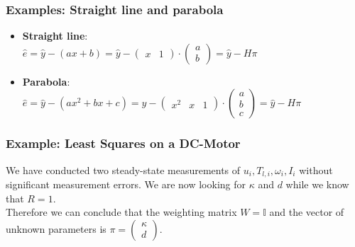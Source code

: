 \documentclass[10pt,a4paper]{scrartcl}
\begin{document}
\begin{multicols*}{3}

\subsubsection{Examples: Straight line and parabola}
\begin{itemize}
\item \textbf{Straight line}:\\
$\hat{e}=\hat{y}-(ax+b)=\hat{y}- \begin{pmatrix} x&1 \end{pmatrix} \cdot \begin{pmatrix} a\\ b\end{pmatrix}=\hat{y}-H\pi$
\item \textbf{Parabola}:\\
$\hat{e}=\hat{y}-(ax^2+bx+c)=\hat{y}- \begin{pmatrix} x^2&x&1 \end{pmatrix} \cdot \begin{pmatrix} a\\ b \\ c\end{pmatrix}=\hat{y}-H\pi$
\end{itemize}

\vfill
\null
\columnbreak

\subsubsection{Example: Least Squares on a DC-Motor}
We have conducted two steady-state measurements of $u_i,T_{l,i},\omega_i,I_i$ without significant measurement errors.
We are now looking for $\kappa$ and $d$ while we know that $R=1$.\\

Therefore we can conclude that the weighting matrix $W=\mathbb{I}$ and the vector of unknown parameters is $\pi=\begin{pmatrix} \kappa \\d\end{pmatrix}$.\\


\end{multicols*}
\end{document}
